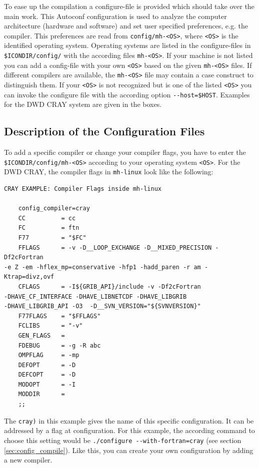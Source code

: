 
To ease up the compilation a configure-file is provided which should take over the main work. This Autoconf configuration is used to analyze the computer architecture (hardware and software) and set user specified preferences, e.g. the compiler. This preferences are read from \verb+config/mh-<OS>+, where \verb+<OS>+ is the identified operating system. Operating systems are listed in the configure-files in \verb+$ICONDIR/config/+ with the according files \verb+mh-<OS>+. If your machine is not listed you can add a config-file with your own \verb+<OS>+ based on the given \verb+mh-<OS>+ files. If different compilers are available, the \verb+mh-<OS>+ file may contain a case construct to distinguish them. If your \verb+<OS>+ is not recognized but is one of the listed \verb+<OS>+ you can invoke the configure file with the according option \verb+--host=$HOST+. Examples for the DWD CRAY system are given in the boxes.

\subsection{Description of the Configuration Files}

To add a specific compiler or change your compiler flags, you have to enter the \newline \verb+$ICONDIR/config/mh-<OS>+ according to your operating system \verb+<OS>+. For the DWD CRAY, the compiler flags in \verb+mh-linux+ look like the following:

\begin{Verbatim}[frame=single]
CRAY EXAMPLE: Compiler Flags inside mh-linux

    config_compiler=cray
	CC          = cc
    FC          = ftn
    F77         = "$FC"
    FFLAGS      = -v -D__LOOP_EXCHANGE -D__MIXED_PRECISION -Df2cFortran 
-e Z -em -hflex_mp=conservative -hfp1 -hadd_paren -r am -Ktrap=divz,ovf
    CFLAGS      = -I${GRIB_API}/include -v -Df2cFortran 
-DHAVE_CF_INTERFACE -DHAVE_LIBNETCDF -DHAVE_LIBGRIB 
-DHAVE_LIBGRIB_API -O3  -D__SVN_VERSION="${SVNVERSION}"
    F77FLAGS    = "$FFLAGS"
    FCLIBS      = "-v"
    GEN_FLAGS   =
    FDEBUG      = -g -R abc
    OMPFLAG     = -mp
    DEFOPT      = -D
    DEFCOPT     = -D
    MODOPT      = -I
    MODDIR      = 
    ;;
\end{Verbatim}

The \verb+cray)+ in this example gives the name of this specific configuration. It can be addressed by a flag at configuration. For this example, the according command to choose this setting would be \verb+./configure --with-fortran=cray+ (see section \ref{sec:config_compile}). Like this, you can create your own configuration by adding a new compiler.

